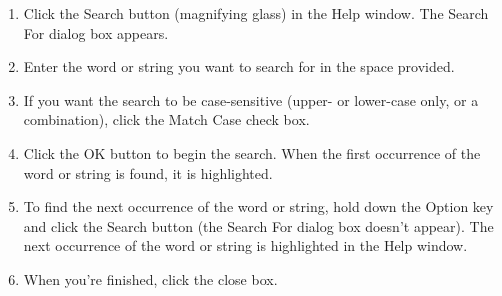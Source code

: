 \begin{enumerate}
\item Click the Search button (magnifying glass) in the Help window. The
Search For dialog box appears. 
\item Enter the word or string you want to search for in the space provided. 
\item If you want the search to be case-sensitive (upper- or lower-case
only, or a combination), click the Match Case check box. 
\item Click the OK button to begin the search. When the first occurrence
of the word or string is found, it is highlighted. 
\item To find the next occurrence of the word or string, hold down the Option
key and click the Search button (the Search For dialog box doesn't
appear). The next occurrence of the word or string is highlighted
in the Help window. 
\item When you're finished, click the close box.\end{enumerate}

